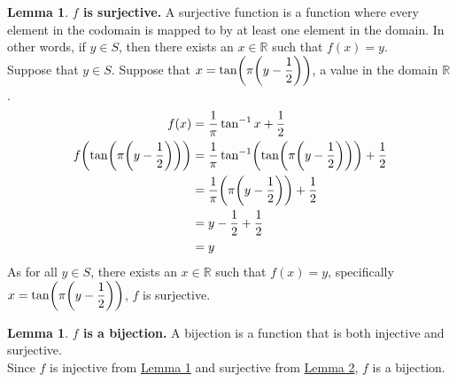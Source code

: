 \documentclass[article, 12pt]{article}
\theoremstyle{definition}
\DeclarePairedDelimiter\paren{(}{)} %
\newcommand{\df}{\displaystyle\frac} %
\newcommand{\reals}{\mathbb{R}} %
\newtheorem{lemma}[section]{Lemma}
\begin{document}
        \begin{lemma}
            \textbf{$f$ is surjective.} A surjective function is a function where every element in the codomain is mapped to by at least one element in the domain. In other words, if $y \in S$, then there exists an $x \in \reals$ such that $f(x) = y$.
            \\[12pt]
            Suppose that $y \in S$. Suppose that $x = \tan\paren*{\pi\paren*{y - \df{1}{2}}}$, a value in the domain $\reals$.
            \begin{align*}
                f(x) &= \df{1}{\pi}\tan^{-1}x + \df{1}{2} \\
                f\paren*{\tan\paren*{\pi\paren*{y - \df{1}{2}}}} &= \df{1}{\pi}\tan^{-1}\paren*{\tan\paren*{\pi\paren*{y - \df{1}{2}}}} + \df{1}{2} \\
                &= \df{1}{\pi}\paren*{\pi\paren*{y - \df{1}{2}}} + \df{1}{2} \\
                &= y - \df{1}{2} + \df{1}{2} \\
                &= y
            \end{align*}
            As for all $y \in S$, there exists an $x \in \reals$ such that $f(x) = y$, specifically $x = \tan\paren*{\pi\paren*{y - \df{1}{2}}}$, $f$ is surjective.
            \label{lemma:surjective}
        \end{lemma}

        \begin{lemma}
            \textbf{$f$ is a bijection.} A bijection is a function that is both injective and surjective. 
            \\[12pt]
            Since $f$ is injective from \hyperref[lemma:injective]{Lemma 1} and surjective from \hyperref[lemma:injective]{Lemma 2}, $f$ is a bijection.
            \label{lemma:bijection}
        \end{lemma}
\end{document}
